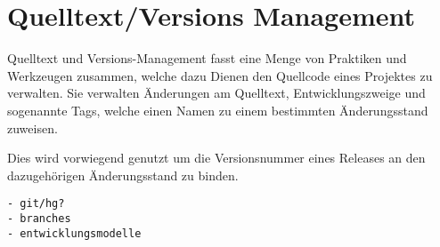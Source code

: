\section{Quelltext/Versions Management}
\label{sec:base:scm}


Quelltext und Versions-Management fasst eine Menge
von Praktiken und Werkzeugen zusammen,
welche dazu Dienen den Quellcode eines Projektes zu verwalten.
Sie verwalten \"Anderungen am Quelltext, Entwicklungszweige und sogenannte Tags,
welche einen Namen zu einem bestimmten \"Anderungsstand zuweisen.

Dies wird vorwiegend genutzt um die Versionsnummer eines Releases an den dazugeh\"origen \"Anderungsstand zu binden.



\begin{verbatim}
- git/hg?
- branches
- entwicklungsmodelle
\end{verbatim}
